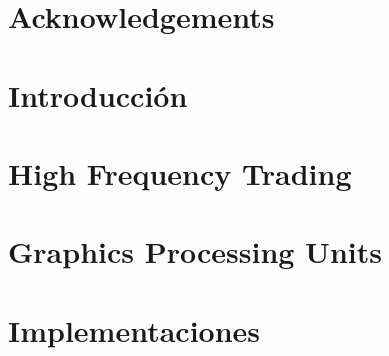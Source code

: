 \documentclass[spanish,12pt,letterpaper,oneside]{book}
\begin{document}
    

    \begin{spacing}{.97}
        \newpage
        

        \newpage
        \chapter*{Acknowledgements}
        \label{ch:acknowledgements}
        

        \newpage
        
        

        \chapter{Introducción}
        \label{ch:introduction}
        

        \chapter{High Frequency Trading}
        \label{ch:hft}
        

        \chapter{Graphics Processing Units}
        \label{ch:gpu}
        



        
        \chapter{Implementaciones}
        \label{ch:implementacion}
        


\end{spacing}
\end{document}
